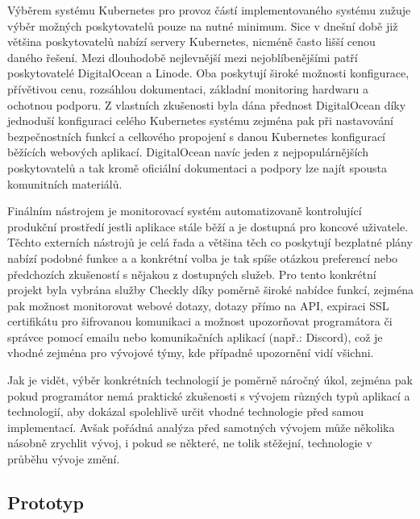 			Výběrem systému Kubernetes pro provoz částí implementovaného systému zužuje výběr možných poskytovatelů pouze na
			nutné minimum.
			Sice v dnešní době již většina poskytovatelů nabízí servery Kubernetes, nicméně často lišší cenou daného řešení.
			Mezi dlouhodobě nejlevnější mezi nejoblíbenějšími patří poskytovatelé DigitalOcean a Linode.
			Oba poskytují široké možnosti konfigurace, přívětivou cenu, rozsáhlou dokumentaci, základní monitoring hardwaru
			a ochotnou podporu.
			Z vlastních zkušenosti byla dána přednost DigitalOcean díky jednoduší konfiguraci celého Kubernetes systému
			zejména pak při nastavování bezpečnostních funkcí a celkového propojení s danou Kubernetes konfigurací běžících
			webových aplikací.
			DigitalOcean navíc jeden z nejpopulárnějších poskytovatelů a tak kromě oficiální dokumentaci a podpory lze
			najít spousta komunitních materiálů.

			Finálním nástrojem je monitorovací systém automatizovaně kontrolující produkční prostředí jestli aplikace
			stále běží a je dostupná pro koncové uživatele.
			Těchto externích nástrojů je celá řada a většina těch co poskytují bezplatné plány nabízí podobné funkce a
			a konkrétní volba je tak spíše otázkou preferencí nebo předchozích zkušeností s nějakou z dostupných služeb.
			Pro tento konkrétní projekt byla vybrána služby Checkly díky poměrně široké nabídce funkcí, zejména pak
			možnost monitorovat webové dotazy, dotazy přímo na \ac{API}, expiraci SSL certifikátu pro šifrovanou
			komunikaci a možnost upozorňovat programátora či správce pomocí emailu nebo komunikačních aplikací
			(např.: Discord), což je vhodné zejména pro vývojové týmy, kde případné upozornění vidí všichni.

	Jak je vidět, výběr konkrétních technologií je poměrně náročný úkol, zejména pak pokud programátor nemá praktické
	zkušenosti s vývojem různých typů aplikací a technologií, aby dokázal spolehlivě určit vhodné technologie před samou
	implementací.
	Avšak pořádná analýza před samotných vývojem může několika násobně zrychlit vývoj, i pokud se některé, ne tolik
	stěžejní, technologie v průběhu vývoje změní.

	\subsection{Prototyp}

